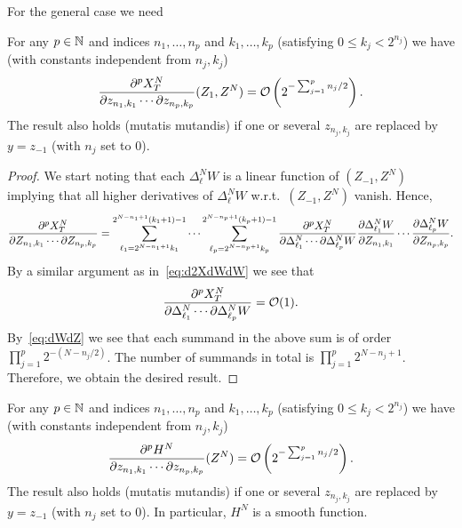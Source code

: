For the general case we need
\begin{lemma}
  \label{lem:d2XdZ2}
  For any $p \in \mathbb{N}$ and indices $n_1, \ldots, n_p$ and $k_1, \ldots, k_p$
  (satisfying $0 \le k_j < 2^{n_j}$) we have (with constants independent from
  $n_j, k_j$)
  \begin{equation*}
    \frac{\partial^p X^N_T}{\partial z_{n_1,k_1} \cdots \partial z_{n_p,k_p}} (Z_1, Z^N) =
    \mathcal{O}\left( 2^{-\sum_{j=1}^p n_j/2} \right).
  \end{equation*}
  The result also holds (mutatis mutandis) if one or several $z_{n_j,k_j}$ are
  replaced by $y = z_{-1}$ (with $n_j$ set to $0$).
\end{lemma}
\begin{proof}
  We start noting that each $\Delta^N_\ell W$ is a linear function of
  $(Z_{-1},Z^N)$ implying that all higher derivatives of $\Delta^N_\ell W$
  w.r.t.~$(Z_{-1},Z^N)$ vanish. Hence,
  \begin{equation*}
    \frac{\partial^p X^N_T}{\partial Z_{n_1,k_1} \cdots \partial Z_{n_p,k_p}} = \sum_{\ell_1 =
      2^{N-n_1+1} k_1}^{2^{N-n_1+1}(k_1+1) - 1} \cdots \sum_{\ell_p =
      2^{N-n_p+1} k_p}^{2^{N-n_p+1}(k_p+1) - 1} \frac{\partial^p X^N_T}{\partial
      \Delta^N_{\ell_1} \cdots \partial \Delta^N_{\ell_p} W} \frac{\partial
      \Delta^N_{\ell_1} W}{\partial Z_{n_1,k_1}} \cdots \frac{\partial
      \Delta^N_{\ell_p}W}{\partial Z_{n_p,k_p}}.
  \end{equation*}
  By a similar argument as in~\eqref{eq:d2XdWdW} we see that
  \begin{equation*}
    \frac{\partial^p X^N_T}{\partial \Delta^N_{\ell_1} \cdots \partial \Delta^N_{\ell_p} W} = \mathcal{O}(1).
  \end{equation*}
  By~\eqref{eq:dWdZ} we see that each summand in the above sum is of order
  $\prod_{j=1}^p 2^{-(N-n_j/2)}$. The number of summands in total is
  $\prod_{j=1}^p 2^{N-n_j+1}$. Therefore, we obtain the desired result. 
\end{proof}

\begin{theorem}
  \label{thr:smoothness}
  For any $p \in \mathbb{N}$ and indices $n_1, \ldots, n_p$ and $k_1, \ldots, k_p$
  (satisfying $0 \le k_j < 2^{n_j}$) we have (with constants independent from
  $n_j, k_j$)
  \begin{equation*}
    \frac{\partial^p H^N}{\partial z_{n_1,k_1} \cdots \partial z_{n_p,k_p}}(Z^N) = 
    \mathcal{O}\left( 2^{-\sum_{j=1}^p n_j/2} \right).
  \end{equation*}
  The result also holds (mutatis mutandis) if one or several $z_{n_j,k_j}$ are
  replaced by $y = z_{-1}$ (with $n_j$ set to $0$). In particular, $H^N$ is a
  smooth function.
\end{theorem}


